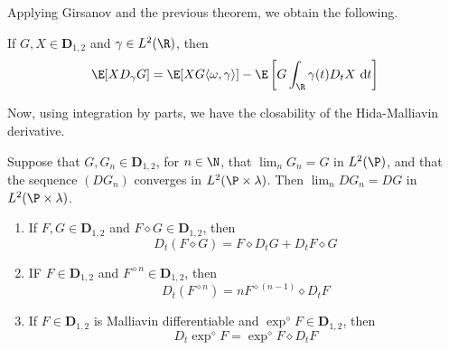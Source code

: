   Applying Girsanov and the previous theorem, we obtain the following.

  \begin{theorem}
    If $G, X \in \mathbf{D}_{1,2}$ and $\gamma \in L^2(\R)$, then 
    \begin{equation}
      \E [X D_\gamma G] = \E [X G \langle \omega, \gamma \rangle] - \E \left[ G \int_\R \gamma(t) D_t X ~\mathrm{d}t \right]
      \label{eq:202404301703}
    \end{equation}
  \end{theorem}

  Now, using integration by parts, we have the closability of the Hida-Malliavin derivative. 

  \begin{theorem}[Closability]\label{thm:closability_hida_derivative}
    Suppose that $G, G_n \in \mathbf{D}_{1,2}$, for $n \in \N$, that $\lim_n G_n = G$ in $L^2(\P)$, and that the sequence $(D G_n)$ converges in $L^2(\P \times \lambda)$. Then $\lim_n D G_n = D G$ in $L^2(\P \times \lambda)$.
  \end{theorem}

  \begin{theorem}\label{thm:wick-chain}
    \begin{enumerate}
      \item If $F, G \in \mathbf{D}_{1,2}$ and $F \diamond G \in \mathbf{D}_{1,2}$, then 
        \[
          D_t (F \diamond G) = F \diamond D_t G + D_t F \diamond G
        \]
      \item IF $F \in \mathbf{D}_{1,2}$ and $F^{\diamond n} \in \mathbf{D}_{1,2}$, then
        \[
          D_t (F^{\diamond n}) = n F^{\diamond (n-1)} \diamond D_t F 
        \]
      \item If $F \in \mathbf{D}_{1,2}$ is Malliavin differentiable and $\exp^\diamond F \in \mathbf{D}_{1,2}$, then 
        \[
          D_t \exp^\diamond F = \exp^\diamond F \diamond D_t F 
        \]
    \end{enumerate}
  \end{theorem}

